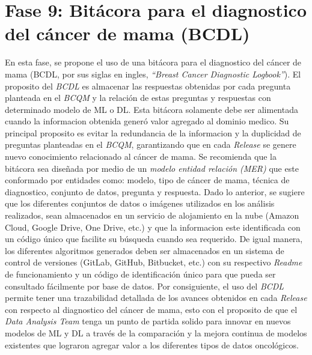 \section{Fase 9: Bitácora para el diagnostico del cáncer de mama (BCDL) }
En esta fase, se propone el uso de una bitácora para el diagnostico del cáncer de mama (BCDL, por sus siglas en ingles, \textit{“Breast Cancer Diagnostic Logbook”}). El proposito del \textit{BCDL} es almacenar las respuestas obtenidas por cada pregunta planteada en el \textit{BCQM} y la relación de estas preguntas y respuestas con determinado modelo de ML o DL. Esta bitácora solamente debe ser alimentada cuando la informacion obtenida generó valor agregado al dominio medico. Su principal proposito es evitar la redundancia de la informacion y la duplicidad de preguntas planteadas en el \textit{BCQM}, garantizando que en cada \textit{Release} se genere nuevo conocimiento relacionado al cáncer de mama. Se recomienda que la bitácora sea diseñada por medio de un \textit{modelo entidad relación (MER)} que este conformado por entidades como: modelo, tipo de cáncer de mama, técnica de diagnostico, conjunto de datos, pregunta y respuesta. Dado lo anterior, se sugiere que  los diferentes conjuntos de datos o imágenes utilizados en los análisis realizados, sean almacenados en un servicio de alojamiento en la nube (Amazon Cloud, Google Drive, One Drive, etc.) y que la informacion este identificada con un código único que facilite su búsqueda cuando sea requerido. De igual manera, los diferentes algoritmos generados deben ser almacenados en un sistema de control de versiones (GitLab, GitHub, Bitbucket, etc.) con su respectivo \textit{Readme} de funcionamiento y un código de identificación único para que pueda ser consultado fácilmente por base de datos. Por consiguiente, el uso del \textit{BCDL} permite tener una trazabilidad detallada de los avances obtenidos en cada \textit{Release} con respecto al diagnostico del cáncer de mama, esto con el proposito de que el \textit{Data Analysis Team} tenga un punto de partida solido para innovar en nuevos modelos de ML y DL a través de la comparación  y la mejora continua de modelos existentes que lograron agregar valor a los diferentes tipos de datos oncológicos.